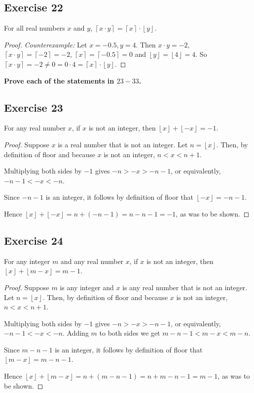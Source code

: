 \documentclass[14pt]{extarticle}
\newcommand{\cy}{\color{cyan}}
\newcommand{\floor}[1]{{\left\lfloor#1\right\rfloor}}
\newcommand{\ceil}[1]{{\left\lceil#1\right\rceil}}
\begin{document}
\subsection{Exercise 22}
For all real numbers $x$ and $y$, $\ceil{x \cdot y} = \ceil{x} \cdot \floor{y}$.

\begin{proof}
    {\it Counterexample:} Let $x = -0.5, y = 4$. Then $x\cdot y = -2$, $\ceil{x\cdot y} = \ceil{-2} = -2$, $\ceil{x} = \ceil{-0.5} = 0$ and $\floor{y} = \floor{4} = 4$. So $\ceil{x\cdot y} = -2 \neq 0 = 0 \cdot 4 = \ceil{x} \cdot \floor{y}$.
\end{proof}

{\bf \cy Prove each of the statements in $23-33$.}

\subsection{Exercise 23}
For any real number $x$, if $x$ is not an integer, then $\floor{x} + \floor{-x} = -1$.

\begin{proof}
    Suppose $x$ is a real number that is not an integer. Let $n = \floor{x}$. Then, by definition of floor and because $x$ is not an integer, $n < x < n + 1$.

    Multiplying both sides by $-1$ gives $-n > -x > -n - 1$, or equivalently, $-n - 1 < -x < -n$.

    Since $-n - 1$ is an integer, it follows by definition of floor that $\floor{-x} = -n - 1$.

    Hence $\floor{x} + \floor{-x} = n + (-n - 1) = n - n - 1 = -1$, as was to be shown.
\end{proof}

\subsection{Exercise 24}
For any integer $m$ and any real number $x$, if $x$ is not an integer, then $\floor{x} + \floor{m-x} = m-1$.

\begin{proof}
    Suppose $m$ is any integer and $x$ is any real number that is not an integer. Let $n = \floor{x}$. Then, by definition of floor and because $x$ is not an integer, $n < x < n + 1$.

    Multiplying both sides by $-1$ gives $-n > -x > -n - 1$, or equivalently, $-n - 1 < -x < -n$. Adding $m$ to both sides we get $m - n - 1 < m - x < m - n$.

    Since $m - n - 1$ is an integer, it follows by definition of floor that $\floor{m - x} = m - n - 1$.

    Hence $\floor{x} + \floor{m - x} = n + (m - n - 1) = n + m - n - 1 = m - 1$, as was to be shown.
\end{proof}
\end{document}
